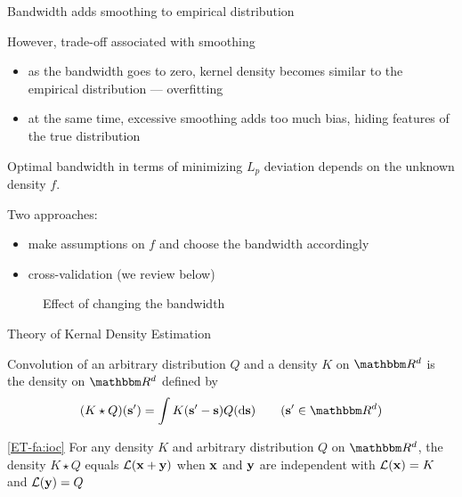 \begin{frame}

    \vspace{2em}
    Bandwidth adds smoothing to empirical distribution
    
    However, trade-off associated with
    smoothing
    \begin{itemize}
        \item as the bandwidth goes to zero,  kernel density becomes similar to the
        empirical distribution --- overfitting
        \item at the same time, excessive smoothing 
        adds too much bias, hiding  features of the true
        distribution
    \end{itemize}

    \vspace{.7em}
    Optimal bandwidth in terms of minimizing $L_p$ deviation depends on the unknown density $f$.
    
    Two  approaches: 
    \begin{itemize}
        \item  make assumptions on $f$ and choose the bandwidth
                accordingly
        \item cross-validation (we review below)
    \end{itemize}

\end{frame}

\begin{frame}

    \begin{figure}
    \centering
    \caption{\label{f:one_dim_kde} Effect of changing the bandwidth}
    \end{figure}
    
\end{frame}

\begin{frame}{Theory of Kernal Density Estimation}

    \vspace{2em}
    Convolution of an
    arbitrary distribution $Q$ and a density $K$ on $\RR^d$ is the density on
    $\RR^d$ defined by
    \begin{equation}
        \label{eq:gconv}
        (K \star Q) (\bolds') = \int K(\bolds' - \bolds) Q(\diff \bolds)
        \qquad (\bolds' \in \RR^d)
    \end{equation}
    
    \vspace{.7em}
    \Fact
    \eqref{ET-fa:ioc}
    For any density $K$ and arbitrary distribution $Q$ on $\RR^d$,
    the density $K \star Q$ equals $\mathcal L({\mathbf x} + {\mathbf y})$ when 
        ${\mathbf x}$ and ${\mathbf y} $ are independent with $\mathcal L({\mathbf x}) = K$
        and $\mathcal L({\mathbf y}) = Q$
        
\end{frame}

